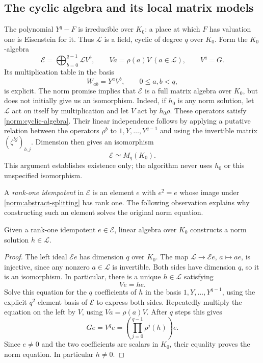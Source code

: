 \subsection{The cyclic algebra and its local matrix models}

The polynomial $Y^q-F$ is irreducible over $K_0$: a place at which $F$
has valuation one is Eisenstein for it.  Thus $\mathcal L$ is a field, cyclic of
degree $q$ over $K_0$.  Form the $K_0$-algebra
\begin{equation}\label{norm:cyclic-algebra}
 \mathcal E=\bigoplus_{b=0}^{q-1} \mathcal L V^b,
 \qquad V a=\rho(a)V\ (a\in \mathcal L),\qquad V^q=G.
\end{equation}
Its multiplication table in the basis
\[
 W_{ab}=Y^aV^b,\qquad 0\le a,b<q,
\]
is explicit.  The norm promise implies that $\mathcal E$ is a full
matrix algebra over $K_0$, but does not initially give us an
isomorphism.  Indeed, if $h_0$ is any norm solution, let $\mathcal L$ act on
itself by multiplication and let $V$ act by $h_0\rho$.  These operators
satisfy \eqref{norm:cyclic-algebra}.  Their linear independence follows
by applying a putative relation between the operators $\rho^b$ to
$1,Y,\ldots,Y^{q-1}$ and using the invertible matrix
$(\zeta^{bj})_{b,j}$.  Dimension then gives an isomorphism
\begin{equation}\label{norm:abstract-splitting}
 \mathcal E\simeq M_q(K_0).
\end{equation}
This argument establishes existence only; the algorithm never uses
$h_0$ or this unspecified isomorphism.

A \emph{rank-one idempotent} in $\mathcal E$ is an element $e$ with
$e^2=e$ whose image under \eqref{norm:abstract-splitting} has rank one.
The following observation explains why constructing such an element
solves the original norm equation.

\begin{lemma}\label{norm:idempotent-to-norm}
Given a rank-one idempotent $e\in\mathcal E$, linear algebra over
$K_0$ constructs a norm solution $h\in \mathcal L$.
\end{lemma}

\begin{proof}
The left ideal $\mathcal E e$ has dimension $q$ over $K_0$.  The map
$\mathcal L\to\mathcal E e$, $a\mapsto ae$, is injective, since any nonzero
$a\in \mathcal L$ is invertible.  Both sides have dimension $q$, so it is an
isomorphism.  In particular, there is a unique $h\in \mathcal L$ satisfying
\begin{equation}\label{norm:extract-h}
 Ve=he.
\end{equation}
Solve this equation for the $q$ coefficients of $h$ in the basis
$1,Y,\ldots,Y^{q-1}$, using the explicit $q^2$-element basis of
$\mathcal E$ to express both sides.  Repeatedly multiply the equation
on the left by $V$, using $Va=\rho(a)V$.  After $q$ steps this gives
\[
 G e=V^q e=\left(\prod_{j=0}^{q-1}\rho^j(h)\right)e.
\]
Since $e\ne0$ and the two coefficients are scalars in $K_0$, their
equality proves the norm equation.  In particular $h\ne0$.
\end{proof}

